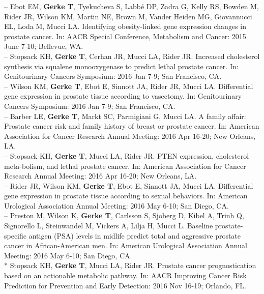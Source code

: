 \documentclass[11pt, a4paper]{article} %
\begin{document}
-- Ebot EM, {\bf Gerke T}, Tyekucheva S, Labb\'{e} DP, Zadra G, Kelly RS, Bowden M, Rider JR, Wilson KM, Martin NE, Brown M, Vander Heiden MG, Giovannucci EL, Loda M, Mucci LA. Identifying obesity-linked gene expression changes in prostate cancer. In: AACR Special Conference, Metabolism and Cancer: 2015 June 7-10; Bellevue, WA.\\

-- Stopsack KH, {\bf Gerke T}, Cerhan JR, Mucci LA, Rider JR. Increased cholesterol synthesis via squalene monooxygenase to predict lethal prostate cancer. In: Genitourinary Cancers Symposium: 2016 Jan 7-9; San Francisco, CA.\\

-- Wilson KM, {\bf Gerke T}, Ebot E, Sinnott JA, Rider JR, Mucci LA. Differential gene expression in prostate tissue according to vasectomy. In: Genitourinary Cancers Symposium: 2016 Jan 7-9; San Francisco, CA.\\

-- Barber LE, {\bf Gerke T}, Markt SC, Parmigiani G, Mucci LA. A family affair: Prostate cancer risk and family history of breast or prostate cancer. In: American Association for Cancer Research Annual Meeting: 2016 Apr 16-20; New Orleans, LA.\\

-- Stopsack KH, {\bf Gerke T}, Mucci LA, Rider JR. PTEN expression, cholesterol meta-bolism, and lethal prostate cancer. In: American Association for Cancer Research Annual Meeting: 2016 Apr 16-20; New Orleans, LA.\\

-- Rider JR, Wilson KM, {\bf Gerke T}, Ebot E, Sinnott JA, Mucci LA. Differential gene expression in prostate tissue according to sexual behaviors. In: American Urological Association Annual Meeting: 2016 May 6-10; San Diego, CA.\\

-- Preston M, Wilson K, {\bf Gerke T}, Carlsson S, Sjoberg D, Kibel A, Trinh Q, Signorello L, Steinwandel M, Vickers A, Lilja H, Mucci L. Baseline prostate-specific antigen (PSA) levels in midlife predict total and aggressive prostate cancer in African-American men. In: American Urological Association Annual Meeting: 2016 May 6-10; San Diego, CA.\\

* Stopsack KH, {\bf Gerke T}, Mucci LA, Rider JR. Prostate cancer prognostication based on an actionable metabolic pathway. In: AACR Improving Cancer Risk Prediction for Prevention and Early Detection: 2016 Nov 16-19; Orlando, FL.\\
\end{document}

